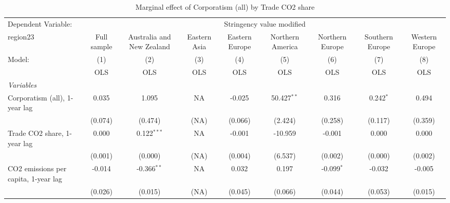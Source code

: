 
\begin{table}[htbp]
   \caption{Marginal effect of Corporatism (all) by Trade CO2 share}
   \centering
   \begin{tabular}{lcccccccc}
      \toprule
      Dependent Variable: & \multicolumn{8}{c}{Stringency value modified}\\
      region23                                                    & Full sample   & Australia and New Zealand & Eastern Asia & Eastern Europe & Northern America & Northern Europe & Southern Europe & Western Europe \\   
      Model:                                                      & (1)           & (2)                       & (3)          & (4)            & (5)              & (6)             & (7)             & (8)\\  
                                                                  &  OLS          & OLS                       & OLS          & OLS            & OLS              & OLS             & OLS             & OLS\\  
      \midrule
      \emph{Variables}\\
      Corporatism (all), 1-year lag                               & 0.035         & 1.095                     & NA           & -0.025         & 50.427$^{**}$    & 0.316           & 0.242$^{*}$     & 0.494\\   
                                                                  & (0.074)       & (0.474)                   & (NA)         & (0.066)        & (2.424)          & (0.258)         & (0.117)         & (0.359)\\   
      Trade CO2 share, 1-year lag                                 & 0.000         & 0.122$^{***}$             & NA           & -0.001         & -10.959          & -0.001          & 0.000           & 0.000\\   
                                                                  & (0.001)       & (0.000)                   & (NA)         & (0.004)        & (6.537)          & (0.002)         & (0.000)         & (0.002)\\   
      CO2 emissions per capita, 1-year lag                        & -0.014        & -0.366$^{**}$             & NA           & 0.032          & 0.197            & -0.099$^{*}$    & -0.032          & -0.005\\   
                                                                  & (0.026)       & (0.015)                   & (NA)         & (0.045)        & (0.066)          & (0.044)         & (0.053)         & (0.015)\\   

\end{tabular}
\end{table}
